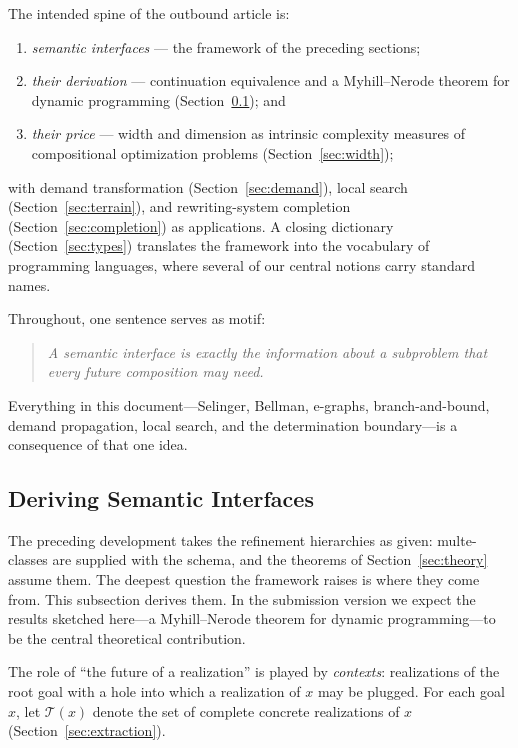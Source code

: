 \documentclass[sigconf,nonacm]{acmart}
\theoremstyle{definition}
\theoremstyle{plain}
\theoremstyle{remark}
\begin{document}
The intended spine of the outbound article is:

\begin{enumerate}
\item \emph{semantic interfaces} --- the framework of the preceding
      sections;
\item \emph{their derivation} --- continuation equivalence and a
      Myhill--Nerode theorem for dynamic programming
      (Section~\ref{sec:continuation}); and
\item \emph{their price} --- width and dimension as intrinsic
      complexity measures of compositional optimization problems
      (Section~\ref{sec:width});
\end{enumerate}

with demand transformation (Section~\ref{sec:demand}), local search
(Section~\ref{sec:terrain}), and rewriting-system completion
(Section~\ref{sec:completion}) as applications.  A closing
dictionary (Section~\ref{sec:types}) translates the framework into
the vocabulary of programming languages, where several of our
central notions carry standard names.

Throughout, one sentence serves as motif:

\begin{quote}
\emph{A semantic interface is exactly the information about a
subproblem that every future composition may need.}
\end{quote}

Everything in this document---Selinger, Bellman, e-graphs,
branch-and-bound, demand propagation, local search, and the
determination boundary---is a consequence of that one idea.

\subsection{Deriving Semantic Interfaces}
\label{sec:continuation}

The preceding development takes the refinement hierarchies as given:
multe-classes are supplied with the schema, and the theorems of
Section~\ref{sec:theory} assume them.  The deepest question the
framework raises is where they come from.  This subsection derives
them.  In the submission version we expect the results sketched
here---a Myhill--Nerode theorem for dynamic programming---to be the
central theoretical contribution.

The role of ``the future of a realization'' is played by
\emph{contexts}: realizations of the root goal with a hole into
which a realization of $x$ may be plugged.  For each goal $x$, let
$\mathcal T(x)$ denote the set of complete concrete realizations of
$x$ (Section~\ref{sec:extraction}).
\end{document}
